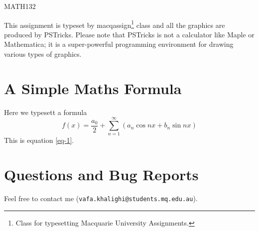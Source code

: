 \documentclass{macqassign}
\begin{document}
\unit{MATH132}
\maketitle

\begin{acknowledgement}
This assignment is typeset by macqassign\footnote{Class for typesetting Macquarie University Assignments.} class and all the graphics are produced by PSTricks. Please note that PSTricks is not a calculator like Maple or Mathematica; it is a super-powerful programming environment for drawing various types of graphics.
\end{acknowledgement}
\tableofcontents
\section{A Simple Maths Formula}
Here we typesett a formula
\begin{equation}
f(x)=\frac{a_0}{2}+\sum_{n=1}^\infty\left(a_n\cos nx+b_n\sin nx\right)\label{eq-1}
\end{equation}
This is equation \eqref{eq-1}.
\section{Questions and Bug Reports}
Feel free to contact me (\texttt{vafa.khalighi@students.mq.edu.au}).
\end{document}
